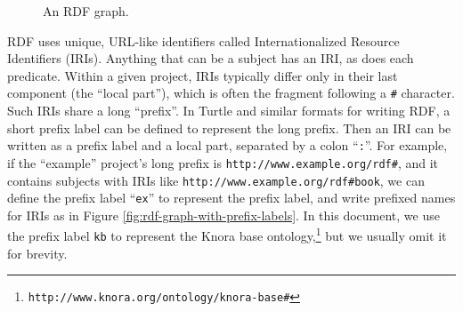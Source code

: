 \documentclass[12pt, a4paper]{article}
\begin{document}
\begin{figure}[h]
\centering
{}

\caption{An RDF graph.}
\label{fig:rdf-graph}
\end{figure}

RDF uses unique, URL-like identifiers called Internationalized Resource Identifiers (IRIs)\cite{RFC_3987}. Anything that can be a subject has an IRI, as does each predicate. Within a given project, IRIs typically differ only in their last component (the \enquote{local part}), which is often the fragment following a \texttt{\#} character. Such IRIs share a long \enquote{prefix}. In Turtle\cite{Turtle} and similar formats for writing RDF, a short prefix label can be defined to represent the long prefix. Then an IRI can be written as a prefix label and a local part, separated by a colon \enquote{\texttt{:}}. For example, if the \enquote{example} project's long prefix is \texttt{http://www.example.org/rdf\#}, and it contains subjects with IRIs like \texttt{http://www.example.org/rdf\#book}, we can define the prefix label \enquote{\texttt{ex}} to represent the prefix label, and write prefixed names for IRIs as in Figure \ref{fig:rdf-graph-with-prefix-labels}. In this document, we use the prefix label \texttt{kb} to represent the Knora base ontology,\footnote{\texttt{http://www.knora.org/ontology/knora-base\#}} but we usually omit it for brevity.
\end{document}
